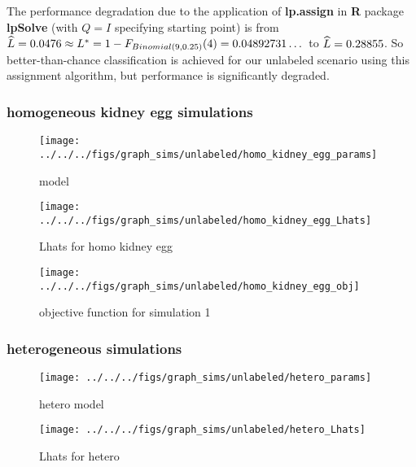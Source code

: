 The performance degradation due to the application of {\bf lp.assign} in {\bf R} package {\bf lpSolve} (with $Q=I$ specifying starting point) is
from $\widehat{L} = 0.0476 \approx L^* = 1-F_{Binomial(9,0.25)}(4) = 0.04892731\dots$ to $\widehat{L} = 0.28855$. So better-than-chance classification is
achieved for our unlabeled scenario using this assignment algorithm, but performance is significantly degraded.


\subsubsection{homogeneous kidney egg simulations} %
\label{ssub:homogeneous_kidney_egg_simulations}


\begin{figure}[htbp]
	\centering		\texttt{[image: ../../../figs/graph\_sims/unlabeled/homo\_kidney\_egg\_params]}
	\caption{model}
	\label{fig:models}
\end{figure}

\begin{figure}[htbp]
	\centering			\texttt{[image: ../../../figs/graph\_sims/unlabeled/homo\_kidney\_egg\_Lhats]}
	\caption{Lhats for homo kidney egg}
	\label{fig:figs_Sims_unlabeled_LPvsFW500}
\end{figure}


\begin{figure}[!ht]
\centering \texttt{[image: ../../../figs/graph\_sims/unlabeled/homo\_kidney\_egg\_obj]}
\caption{objective function for simulation 1}
\label{fig:sim1_params}
\end{figure}





\subsubsection{heterogeneous simulations} %
\label{ssub:heterogeneous_simulations}

\begin{figure}[htbp]
	\centering		\texttt{[image: ../../../figs/graph\_sims/unlabeled/hetero\_params]}
	\caption{hetero model}
	\label{fig:models}
\end{figure}

\begin{figure}[htbp]
	\centering			\texttt{[image: ../../../figs/graph\_sims/unlabeled/hetero\_Lhats]}
	\caption{Lhats for hetero}
	\label{fig:figs_Sims_unlabeled_LPvsFW500}
\end{figure}


